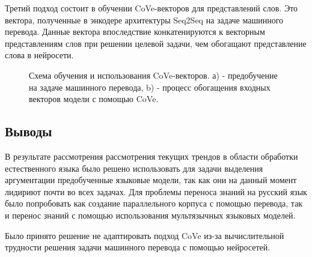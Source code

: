Третий подход состоит в обучении CoVe-векторов для представлений слов. Это вектора, полученные в энкодере архитектуры Seq2Seq на задаче машинного перевода. Данные вектора впоследствие конкатенируются к векторным представлениям слов при решении целевой задачи, чем  обогащают представление слова в  нейросети.

\begin{figure}[H]
 \caption{Схема обучения и использования CoVe-векторов. а) - предобучение на задаче машинного перевода, b) - процесс обогащения входных векторов модели с помощью CoVe.}
\end{figure}

\subsection{Выводы}
В результате рассмотрения рассмотрения текущих трендов в области обработки естественного языка было решено использовать для задачи выделения аргументации предобученные языковые модели, так как они на данный момент лидириют почти во всех задачах. Для проблемы переноса знаний на русский язык было попробовать как создание параллельного корпуса с помощью перевода, так и перенос знаний с помощью использования мультязычных языковых моделей. 

Было принято решение не адаптировать подход CoVe из-за вычислительной трудности решения задачи машинного перевода с помощью нейросетей.
